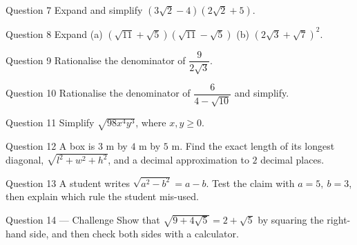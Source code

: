 \documentclass[11pt]{article}
\begin{document}
\begin{qbox}{Question 7}
Expand and simplify $\left(3\sqrt2-4\right)\left(2\sqrt2+5\right)$.\workspace{3cm}
\end{qbox}

\begin{qbox}{Question 8}
Expand (a) $\left(\sqrt{11}+\sqrt5\right)\left(\sqrt{11}-\sqrt5\right)$ \quad (b) $\left(2\sqrt3+\sqrt7\right)^2$.\workspace{3.2cm}
\end{qbox}

\begin{qbox}{Question 9}
Rationalise the denominator of $\dfrac{9}{2\sqrt3}$.\workspace{2.6cm}
\end{qbox}

\begin{qbox}{Question 10}
Rationalise the denominator of $\dfrac{6}{4-\sqrt{10}}$ and simplify.\workspace{3.2cm}
\end{qbox}

\begin{qbox}{Question 11}
Simplify $\sqrt{98x^4y^3}$, where $x,y\ge0$.\workspace{2.6cm}
\end{qbox}

\begin{qbox}{Question 12}
A box is $3$ m by $4$ m by $5$ m. Find the exact length of its longest diagonal, $\sqrt{l^2+w^2+h^2}$, and a decimal approximation to $2$ decimal places.\workspace{3cm}
\end{qbox}

\begin{qbox}{Question 13}
A student writes $\sqrt{a^2-b^2}=a-b$. Test the claim with $a=5,\ b=3$, then explain which rule the student mis-used.\workspace{3.2cm}
\end{qbox}

\begin{qbox}{Question 14 --- Challenge}
Show that $\sqrt{9+4\sqrt5}=2+\sqrt5$ by squaring the right-hand side, and then check both sides with a calculator.\workspace{4cm}
\end{qbox}

\clearpage
{}
\end{document}
